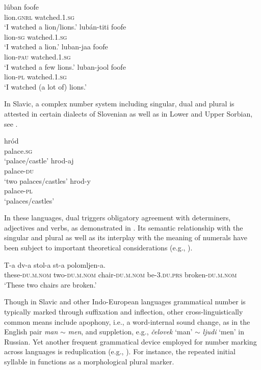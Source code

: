 \documentclass[output=paper]{langscibook}
\begin{document}
\ea\label{doc-wag:ex:number-bayso} 
\ea \gll lúban foofe\\
lion.\textsc{gnrl} watched\textsc{.1.sg}\\
\glt `I watched a lion/lions.'
\ex \gll lubán-titi foofe\\
lion-\textsc{sg} watched\textsc{.1.sg}\\
\glt `I watched a lion.'
\ex \gll luban-jaa foofe\\
lion-\textsc{pau} watched\textsc{.1.sg}\\
\glt `I watched a few lions.'
\ex \gll luban-jool foofe\\
lion-\textsc{pl} watched\textsc{.1.sg}\\
\glt `I watched (a lot of) lions.' \hfill \citep[Bayso, Cushitic;][11, adapted]{corbett2000number}
\z
\z

\noindent In Slavic, a complex number system including singular, dual and plural is attested in certain dialects of Slovenian as well as in Lower and Upper Sorbian, see . 

\ea\label{doc-wag:ex:number-sorbian}
\ea \gll hród\\ 
palace.\textsc{sg}\\
\glt `palace/castle' 
\ex \gll hrod-aj\\ 
palace-\textsc{du}\\
\glt `two palaces/castles'
\ex \gll hrod-y\\ 
palace-\textsc{pl}\\
\glt `palaces/castles' \hfill \citep[Upper Sorbian;][20, adapted]{corbett2000number}
\z
\z

\noindent In these languages, dual %
triggers obligatory agreement with determiners, adjectives and verbs, as demonstrated in . Its semantic relationship with the singular and plural as well as its interplay with the meaning of numerals have been subject to important theoretical considerations (e.g., \citealt{dvorak_sauerland2006semantics, marti2020dual}).

\ea\label{doc-wag:ex:number-slovenian} \gll T-a dv-a stol-a st-a polomljen-a.\\
these-\textsc{du.m.nom} two-\textsc{du.m.nom} chair-\textsc{du.m.nom} be-\textsc{3.du.prs} broken-\textsc{du.m.nom}\\
\glt `These two chairs are broken.' \hfill \citep[Slovenian;][168, adapted]{derganc2003dual}
\z

\noindent Though in Slavic and other Indo-European languages grammatical number is typically marked through suffixation and inflection, other cross-linguistically common means include apophony, i.e., a word-internal sound change, as in the English pair \textit{man} $\sim$ \textit{men}, and suppletion, e.g., \textit{čelovek} `man' $\sim$ \textit{ljudi} `men' in Russian. Yet another frequent grammatical device employed for number marking across languages is reduplication (e.g., \citealt{moravcsik1978reduplicative, corbett2000number}). For instance, the repeated initial syllable in  functions as a morphological plural marker.
\end{document}
